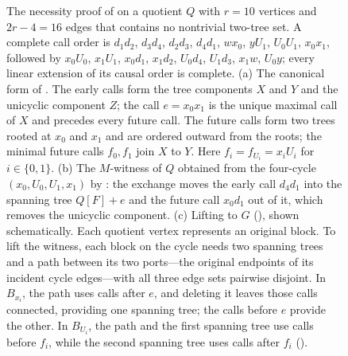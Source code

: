 \documentclass[USenglish, a4paper, thm-restate,numberwithinsect, cleveref]{lipics-v2021}
\begin{document}
\begin{figure}[t]
\caption{The necessity proof of  on a quotient
$Q$ with $r=10$ vertices and $2r-4=16$ edges that contains no nontrivial
two-tree set. A complete call order is $d_1d_2$, $d_3d_4$, $d_2d_3$,
$d_4d_1$, $wx_0$, $yU_1$, $U_0U_1$, $x_0x_1$, followed by $x_0U_0$,
$x_1U_1$, $x_0d_1$, $x_1d_2$, $U_0d_4$, $U_1d_3$, $x_1w$, $U_0y$; every
linear extension of its causal order is complete.
(a) The canonical form of
.
The early calls form the tree components $X$ and $Y$ and the unicyclic
component $Z$; the call $e=x_0x_1$ is the unique maximal call of $X$
and precedes every future call. The future calls form two trees rooted at
$x_0$ and $x_1$ and are ordered outward from the roots; the minimal
future calls $f_0,f_1$ join $X$ to $Y$. Here
$f_i=f_{U_i}=x_iU_i$ for $i\in\{0,1\}$.
(b) The $M$-witness of $Q$
obtained from the four-cycle $(x_0,U_0,U_1,x_1)$ by
: the exchange moves the
early call $d_4d_1$ into the spanning tree $Q[F]+e$ and the future call
$x_0d_1$ out of it, which removes the unicyclic component.
(c) Lifting to $G$ (), shown
schematically. Each quotient vertex represents an original block.
To lift the witness, each block on the cycle needs two spanning trees
and a path between its two ports---the original endpoints of its
incident cycle edges---with all three edge sets pairwise disjoint.
In $B_{x_i}$, the path uses calls after $e$, and deleting it leaves
those calls connected, providing one spanning tree; the calls before
$e$ provide the other. In $B_{U_i}$, the path and the first spanning
tree use calls before $f_i$, while the second spanning tree uses
calls after $f_i$
().}
\label{fig:necessity-canonical}
\end{figure}
\end{document}
